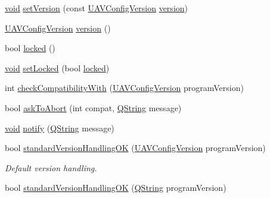 \begin{DoxyCompactItemize}
\item 
\hyperlink{group___u_a_v_objects_plugin_ga444cf2ff3f0ecbe028adce838d373f5c}{void} \hyperlink{group___core_plugin_ga10f4af0da477f5dc204e90f098536f8e}{set\-Version} (const \hyperlink{class_core_1_1_u_a_v_config_version}{\-U\-A\-V\-Config\-Version} \hyperlink{group___core_plugin_ga445d72afa775caf72f6d61884a36e7aa}{version})
\item 
\hyperlink{class_core_1_1_u_a_v_config_version}{\-U\-A\-V\-Config\-Version} \hyperlink{group___core_plugin_ga445d72afa775caf72f6d61884a36e7aa}{version} ()
\item 
bool \hyperlink{group___core_plugin_gae8a23766a2405c85a6ac7515dc1e5e9d}{locked} ()
\item 
\hyperlink{group___u_a_v_objects_plugin_ga444cf2ff3f0ecbe028adce838d373f5c}{void} \hyperlink{group___core_plugin_gaf37f5f245b67fb9dcf0ae19779ec8a73}{set\-Locked} (bool \hyperlink{group___core_plugin_gae8a23766a2405c85a6ac7515dc1e5e9d}{locked})
\item 
int \hyperlink{group___core_plugin_gab48536a30f7d945c7016ab7494f601b5}{check\-Compatibility\-With} (\hyperlink{class_core_1_1_u_a_v_config_version}{\-U\-A\-V\-Config\-Version} program\-Version)
\item 
bool \hyperlink{group___core_plugin_ga1648c527c920c77b7ba0c74881b5879a}{ask\-To\-Abort} (int compat, \hyperlink{group___u_a_v_objects_plugin_gab9d252f49c333c94a72f97ce3105a32d}{\-Q\-String} message)
\item 
\hyperlink{group___u_a_v_objects_plugin_ga444cf2ff3f0ecbe028adce838d373f5c}{void} \hyperlink{group___core_plugin_ga63c43e21f82a123395715f520bdb27ad}{notify} (\hyperlink{group___u_a_v_objects_plugin_gab9d252f49c333c94a72f97ce3105a32d}{\-Q\-String} message)
\item 
bool \hyperlink{group___core_plugin_ga930044c2182f030e9e7dbae1ced5d69e}{standard\-Version\-Handling\-O\-K} (\hyperlink{class_core_1_1_u_a_v_config_version}{\-U\-A\-V\-Config\-Version} program\-Version)
\begin{DoxyCompactList}\small\item\em \-Default version handling. \end{DoxyCompactList}\item 
bool \hyperlink{group___core_plugin_ga0a9befeee7c88114d44c760860926608}{standard\-Version\-Handling\-O\-K} (\hyperlink{group___u_a_v_objects_plugin_gab9d252f49c333c94a72f97ce3105a32d}{\-Q\-String} program\-Version)
\end{DoxyCompactItemize}


